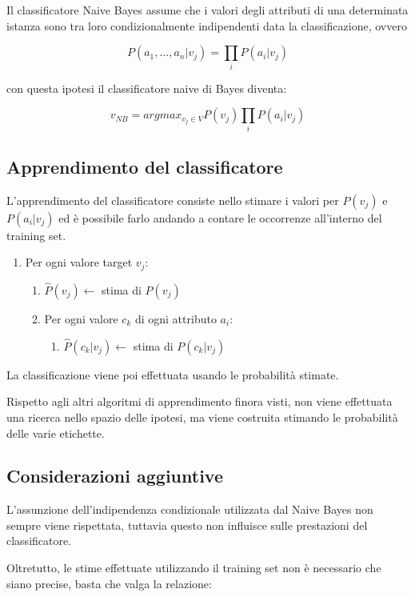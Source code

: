 Il classificatore Naive Bayes assume che i valori degli attributi di una determinata istanza sono tra loro condizionalmente indipendenti data la classificazione, ovvero

$$
P(a_1,\ldots, a_n | v_j) = \prod_i P(a_i | v_j)
$$

con questa ipotesi il classificatore naive di Bayes diventa:

$$ 
v_{NB} = argmax_{v_j \in V} P(v_j)\prod_i P(a_i | v_j)
$$

\subsection{Apprendimento del classificatore}

L'apprendimento del classificatore consiste nello stimare i valori per $P(v_j)$ e $P(a_i | v_j)$ ed è possibile farlo andando a contare le occorrenze all'interno del training set.

\begin{enumerate}
	\item Per ogni valore target $v_j$:
		\begin{enumerate}
			\item $\hat{P}(v_j) \leftarrow$ stima di $P(v_j)$
			\item Per ogni valore $c_k$ di ogni attributo $a_i$:
				\begin{enumerate}
					\item $\hat{P}(c_k | v_j) \leftarrow$ stima di $P(c_k | v_j)$
				\end{enumerate}
		\end{enumerate}
\end{enumerate}

La classificazione viene poi effettuata usando le probabilità stimate.

Rispetto agli altri algoritmi di apprendimento finora visti, non viene effettuata una ricerca nello spazio delle ipotesi, ma viene costruita stimando le probabilità delle varie etichette.


\subsection{Considerazioni aggiuntive}

L'assunzione dell'indipendenza condizionale utilizzata dal Naive Bayes non sempre viene rispettata, tuttavia questo non influisce sulle prestazioni del classificatore.

Oltretutto, le stime effettuate utilizzando il training set non è necessario che siano precise, basta che valga la relazione:

